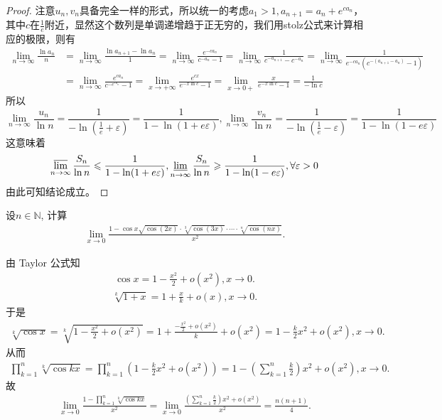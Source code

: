\documentclass[../../main.tex]{subfiles}
\begin{document}
\begin{proof}
注意\(u_n,v_n\)具备完全一样的形式，所以统一的考虑\(a_1>1,a_{n + 1}=a_n + e^{ca_n}\)，其中\(c\)在\(\frac{1}{e}\)附近，显然这个数列是单调递增趋于正无穷的，我们用stolz公式来计算相应的极限，则有
\begin{align*}
\lim_{n\rightarrow\infty}\frac{\ln a_n}{n}&=\lim_{n\rightarrow\infty}\frac{\ln a_{n + 1}-\ln a_n}{1}=\lim_{n\rightarrow\infty}\frac{e^{-ca_n}}{c^{-a_n}-1}=\lim_{n\rightarrow\infty}\frac{1}{c^{-a_{n + 1}}-c^{-a_n}}=\lim_{n\rightarrow\infty}\frac{1}{e^{-ca_n}(c^{-(a_{n + 1}-a_n)}-1)}\\
&=\lim_{n\rightarrow\infty}\frac{e^{ca_n}}{c^{-e^{ca_n}}-1}=\lim_{x\rightarrow+\infty}\frac{e^{cx}}{e^{-x\ln c}-1}=\lim_{x\rightarrow0+}\frac{x}{e^{-x\ln c}-1}=\frac{1}{-\ln c}
\end{align*}
所以
\[\lim_{n\rightarrow\infty}\frac{u_n}{\ln n}=\frac{1}{-\ln(\frac{1}{e}+\varepsilon)}=\frac{1}{1-\ln(1 + e\varepsilon)},\lim_{n\rightarrow\infty}\frac{v_n}{\ln n}=\frac{1}{-\ln(\frac{1}{e}-\varepsilon)}=\frac{1}{1-\ln(1 - e\varepsilon)}\]
这意味着
\[\varlimsup_{n\rightarrow\infty}\frac{S_n}{\ln n}\leqslant \frac{1}{1-\ln(1 + e\varepsilon)},\varliminf_{n\rightarrow\infty}\frac{S_n}{\ln n}\geqslant \frac{1}{1-\ln(1 - e\varepsilon)},\forall\varepsilon>0\]
由此可知结论成立。
\end{proof}

\begin{example}
设$n \in \mathbb{N}$, 计算
\begin{align*}
\lim_{x \to 0} \frac{1 - \cos x \sqrt{\cos (2x)} \cdot \sqrt[3]{\cos (3x)} \cdot \cdots \cdot \sqrt[n]{\cos (nx)}}{x^2}.
\end{align*}
\end{example}
\begin{solution}
由 Taylor 公式知
\begin{align*}
\cos x = 1 - \frac{x^2}{2} + o(x^2), x \to 0.
\end{align*}
\begin{align*}
\sqrt[k]{1 + x} = 1 + \frac{x}{k} + o(x), x \to 0.
\end{align*}
于是
\begin{align*}
\sqrt[k]{\cos x} = \sqrt[k]{1 - \frac{x^2}{2} + o(x^2)} = 1 + \frac{-\frac{x^2}{2} + o(x^2)}{k} + o(x^2) = 1 - \frac{k}{2}x^2 + o(x^2), x \to 0.
\end{align*}
从而
\begin{align*}
\prod_{k=1}^n \sqrt[k]{\cos kx} = \prod_{k=1}^n \left( 1 - \frac{k}{2}x^2 + o(x^2) \right) = 1 - \left( \sum_{k=1}^n \frac{k}{2} \right) x^2 + o(x^2), x \to 0.
\end{align*}
故
\begin{align*}
\lim_{x \to 0} \frac{1 - \prod\limits_{k=1}^n \sqrt[k]{\cos kx}}{x^2} = \lim_{x \to 0} \frac{\left( \sum\limits_{k=1}^n \frac{k}{2} \right) x^2 + o(x^2)}{x^2} = \frac{n(n + 1)}{4}.
\end{align*}
\end{solution}
\end{document}
